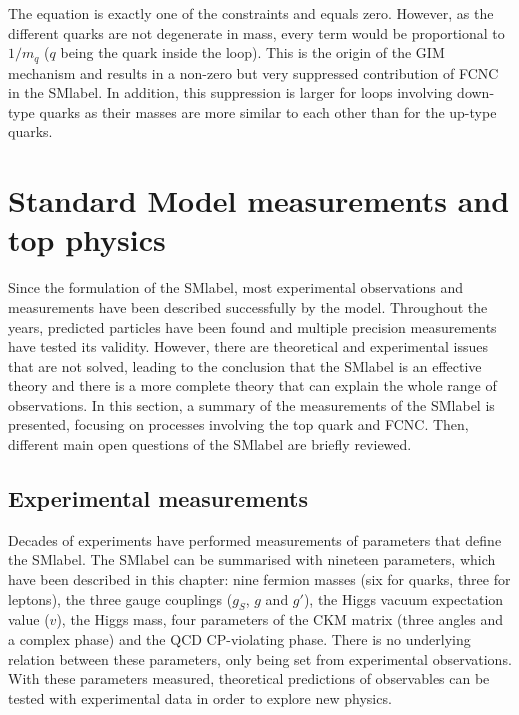 The equation is exactly one of the constraints and equals zero.  However, as the different quarks are not degenerate in mass, every term would be proportional to $1/m_q$ ($q$ being the quark inside the loop). This is the origin of the GIM mechanism and results in a non-zero but very suppressed contribution of FCNC in the \acrshort{SMlabel}. In addition, this suppression is larger for loops involving down-type quarks as their masses are more similar to each other than for the up-type quarks.

\section{Standard Model measurements and top physics}

Since the formulation of the \acrshort{SMlabel}, most experimental observations and measurements have been described successfully by the model. Throughout the years, predicted particles have been found and multiple precision measurements have tested its validity. However, there are theoretical and experimental issues that are not solved, leading to the conclusion that the \acrshort{SMlabel} is an effective theory and there is a more complete theory that can explain the whole range of observations. In this section, a summary of the measurements of the \acrshort{SMlabel} is presented, focusing on processes involving the top quark and FCNC. Then, different main open questions of the \acrshort{SMlabel} are briefly reviewed.

\subsection{Experimental measurements}

Decades of experiments have performed measurements of parameters that define the \acrshort{SMlabel}. The \acrshort{SMlabel} can be summarised with nineteen parameters, which have been described in this chapter: nine fermion masses (six for quarks, three for leptons), the three gauge couplings ($g_S$, $g$ and $g'$), the Higgs vacuum expectation value ($v$), the Higgs mass, four parameters of the CKM matrix (three angles and a complex phase) and the \acrshort{QCD} CP-violating phase. There is no underlying relation between these parameters, only being set from experimental observations. With these parameters measured, theoretical predictions of observables can be tested with experimental data in order to explore new physics.\\

